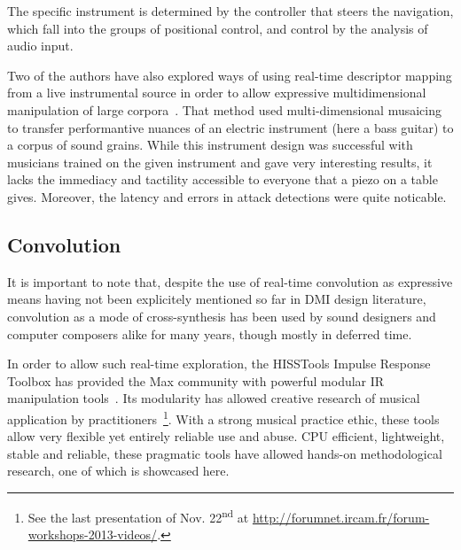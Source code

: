 
The specific instrument is determined by the controller that steers the
navigation, which fall into the groups of positional control, and control by the analysis of audio
input.

\label{sandbox}
Two of the authors have also explored ways of using real-time descriptor mapping from a live instrumental source in order to allow expressive multidimensional manipulation of large corpora~\cite{TremblaySchwarz-nime2010-surfing-the-waves}. That method used multi-dimensional musaicing to transfer performantive nuances of an electric instrument (here a bass guitar) to a corpus of sound grains. While this instrument design was successful with musicians trained on the given instrument and gave very interesting results, it lacks the immediacy and tactility accessible to everyone that a piezo on a table gives. Moreover, the latency and errors in attack detections were quite noticable.


\subsection{Convolution}

It is important to note that, despite the use of real-time convolution as expressive means having not been explicitely mentioned so far in DMI design literature, convolution as a mode of cross-synthesis has been used by sound designers and computer composers alike for many years, though mostly in deferred time.

In order to allow such real-time exploration, the HISSTools Impulse Response Toolbox has provided the Max community with powerful modular IR manipulation tools~\cite{HarkerTremblay-icmc2012-hisstools}. Its modularity has allowed creative research of musical application by practitioners~\cite{HarkerTremblay-forum2013-rethinking-the-box}\footnote{See  the last presentation of Nov. 22\textsuperscript{nd} at \url{http://forumnet.ircam.fr/forum-workshops-2013-videos/}.}. With a strong musical practice ethic, these tools allow very flexible yet entirely reliable use and abuse. CPU efficient, lightweight, stable and reliable, these pragmatic tools have allowed hands-on methodological research, one of which is showcased here.


